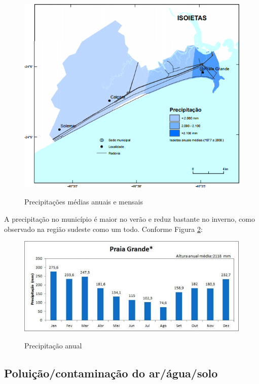 	\begin{figure}[htb]
		\centering
		\caption{Precipitações médias anuais e mensais}
		\includegraphics[width=1\textwidth]{img/mapa_precipitacao.png}
		\label{mapa_precipitacao}
	\end{figure}	
	
	A precipitação no município é maior no verão e reduz bastante no inverno, como observado na região sudeste como um todo. Conforme Figura \ref{graf_precipitacao}:
	
	\begin{figure}[H]
		\centering
		\caption{Precipitação anual}
		\includegraphics[width=1\textwidth]{img/precipitacao.png}
		\label{graf_precipitacao}
	\end{figure}	
	
	\subsection{Poluição/contaminação do ar/água/solo}
	
